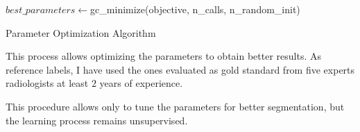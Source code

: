 \documentclass{standalone}
\begin{document}
	
	\begin{algorithm}[h!]
	
		\SetAlgoLined
		\DontPrintSemicolon
		
		
			
		
		
		$best\_parameters\leftarrow$gc\_minimize(objective, n\_calls, n\_random\_init)\;
		
			\caption{Parameter Optimization Algorithm}\label{alg:optimize}
	\end{algorithm}
		
	This process allows optimizing the parameters to obtain better results. As reference labels, I have used the ones evaluated as gold standard from five experts radiologists at least $2$ years of experience.

	This procedure allows only to tune the parameters for better segmentation, but the learning process remains unsupervised.
\end{document}
